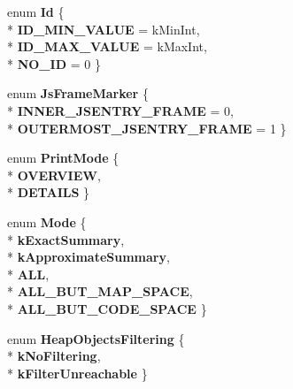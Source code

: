 \begin{DoxyCompactItemize}
\item 
enum {\bfseries Id} \{ \\*
{\bfseries I\+D\+\_\+\+M\+I\+N\+\_\+\+V\+A\+L\+UE} = k\+Min\+Int, 
\\*
{\bfseries I\+D\+\_\+\+M\+A\+X\+\_\+\+V\+A\+L\+UE} = k\+Max\+Int, 
\\*
{\bfseries N\+O\+\_\+\+ID} = 0
 \}\hypertarget{classv8_1_1internal_1_1_b_a_s_e___e_m_b_e_d_d_e_d_aaaee46232f5b050c6f414648c7c9188c}{}\label{classv8_1_1internal_1_1_b_a_s_e___e_m_b_e_d_d_e_d_aaaee46232f5b050c6f414648c7c9188c}

\item 
enum {\bfseries Js\+Frame\+Marker} \{ \\*
{\bfseries I\+N\+N\+E\+R\+\_\+\+J\+S\+E\+N\+T\+R\+Y\+\_\+\+F\+R\+A\+ME} = 0, 
\\*
{\bfseries O\+U\+T\+E\+R\+M\+O\+S\+T\+\_\+\+J\+S\+E\+N\+T\+R\+Y\+\_\+\+F\+R\+A\+ME} = 1
 \}\hypertarget{classv8_1_1internal_1_1_b_a_s_e___e_m_b_e_d_d_e_d_a6e8f0f08e4e94d957675dd02223a8c1a}{}\label{classv8_1_1internal_1_1_b_a_s_e___e_m_b_e_d_d_e_d_a6e8f0f08e4e94d957675dd02223a8c1a}

\item 
enum {\bfseries Print\+Mode} \{ \\*
{\bfseries O\+V\+E\+R\+V\+I\+EW}, 
\\*
{\bfseries D\+E\+T\+A\+I\+LS}
 \}\hypertarget{classv8_1_1internal_1_1_b_a_s_e___e_m_b_e_d_d_e_d_a7db761bcaf86c69d87422f9740db001b}{}\label{classv8_1_1internal_1_1_b_a_s_e___e_m_b_e_d_d_e_d_a7db761bcaf86c69d87422f9740db001b}

\item 
enum {\bfseries Mode} \{ \\*
{\bfseries k\+Exact\+Summary}, 
\\*
{\bfseries k\+Approximate\+Summary}, 
\\*
{\bfseries A\+LL}, 
\\*
{\bfseries A\+L\+L\+\_\+\+B\+U\+T\+\_\+\+M\+A\+P\+\_\+\+S\+P\+A\+CE}, 
\\*
{\bfseries A\+L\+L\+\_\+\+B\+U\+T\+\_\+\+C\+O\+D\+E\+\_\+\+S\+P\+A\+CE}
 \}\hypertarget{classv8_1_1internal_1_1_b_a_s_e___e_m_b_e_d_d_e_d_af8f1017bb278d327a70ab5e29c7cad84}{}\label{classv8_1_1internal_1_1_b_a_s_e___e_m_b_e_d_d_e_d_af8f1017bb278d327a70ab5e29c7cad84}

\item 
enum {\bfseries Heap\+Objects\+Filtering} \{ \\*
{\bfseries k\+No\+Filtering}, 
\\*
{\bfseries k\+Filter\+Unreachable}
 \}\hypertarget{classv8_1_1internal_1_1_b_a_s_e___e_m_b_e_d_d_e_d_aae6ffde1429354610bcff351a7a0afb4}{}\label{classv8_1_1internal_1_1_b_a_s_e___e_m_b_e_d_d_e_d_aae6ffde1429354610bcff351a7a0afb4}


\end{DoxyCompactItemize}
